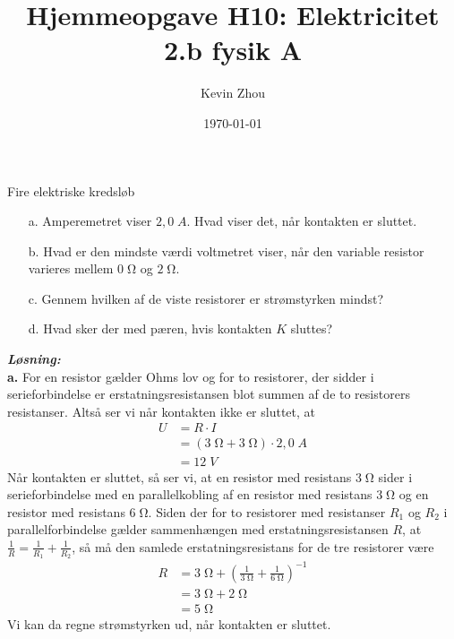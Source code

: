 \documentclass{report}
\title{Hjemmeopgave H10: Elektricitet\\
{\Large \textbf{2.b fysik A}}}
\author{Kevin Zhou}
\date{\today}
\newcommand{\sol}{\setlength{\parindent}{0cm}\textbf{\textit{Løsning:}}\setlength{\parindent}{1cm}}
\begin{document}
\maketitle
\begin{question}{Fire elektriske kredsløb}{}
  \begin{itemize}
    \item[a.] Amperemetret viser $2,0 \;\unit{A} $. Hvad viser det, når kontakten er sluttet.
    \item[b.] Hvad er den mindste værdi voltmetret viser, når den variable resistor varieres mellem $0 \;\unit{\ohm} $ og $2 \;\unit{\ohm} $. 
    \item[c.] Gennem hvilken af de viste resistorer er strømstyrken mindst?
    \item[d.] Hvad sker der med pæren, hvis kontakten $K$ sluttes? 
  \end{itemize}
\end{question}
\sol \\
\textbf{a.} For en resistor gælder Ohms lov og for to resistorer, der sidder i serieforbindelse er erstatningsresistansen blot summen af de to resistorers resistanser.
Altså ser vi når kontakten ikke er sluttet, at
\begin{equation*}
\begin{split}
  U&=R \cdot I\\ 
  &=(3 \;\unit{\ohm} +3 \;\unit{\ohm} ) \cdot 2,0 \;\unit{A} \\ 
  &=12 \;\unit{V} 
\end{split}
\end{equation*}
Når kontakten er sluttet, så ser vi, at en resistor med resistans $3 \;\unit{\ohm} $ sider i serieforbindelse med en parallelkobling af en resistor med resistans $3 \;\unit{\ohm} $ og en resistor med resistans $6 \;\unit{\ohm} $.
Siden der for to resistorer med resistanser $R_1$ og $R_2$ i parallelforbindelse gælder sammenhængen med erstatningsresistansen $R$, at $\frac{1}{R}=\frac{1}{R_1}+\frac{1}{R_2}$, så må den samlede erstatningsresistans for de tre resistorer være
\begin{equation*}
\begin{split}
  R&=3 \;\unit{\ohm} + \left(\frac{1}{3 \;\unit{\ohm} }+\frac{1}{6 \;\unit{\ohm} }\right)^{-1}\\
  &=3 \;\unit{\ohm} + 2 \;\unit{\ohm} \\ 
  &=5 \;\unit{\ohm} 
\end{split}
\end{equation*}
Vi kan da regne strømstyrken ud, når kontakten er sluttet.
\end{document}
